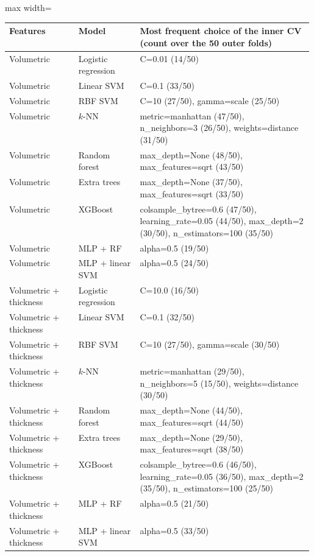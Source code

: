 \begin{table}[H]
\centering
\scriptsize
\setlength{\tabcolsep}{4pt}
\begin{adjustbox}{max width=\linewidth}
\begin{tabular}{llp{0.58\linewidth}}
\toprule
Features & Model & Most frequent choice of the inner CV (count over the 50 outer folds) \\
\midrule
Volumetric & Logistic regression & C=0.01 (14/50) \\
Volumetric & Linear SVM & C=0.1 (33/50) \\
Volumetric & RBF SVM & C=10 (27/50), gamma=scale (25/50) \\
Volumetric & $k$-NN & metric=manhattan (47/50), n\_neighbors=3 (26/50), weights=distance (31/50) \\
Volumetric & Random forest & max\_depth=None (48/50), max\_features=sqrt (43/50) \\
Volumetric & Extra trees & max\_depth=None (37/50), max\_features=sqrt (33/50) \\
Volumetric & XGBoost & colsample\_bytree=0.6 (47/50), learning\_rate=0.05 (44/50), max\_depth=2 (30/50), n\_estimators=100 (35/50) \\
Volumetric & MLP + RF & alpha=0.5 (19/50) \\
Volumetric & MLP + linear SVM & alpha=0.5 (24/50) \\
Volumetric + thickness & Logistic regression & C=10.0 (16/50) \\
Volumetric + thickness & Linear SVM & C=0.1 (32/50) \\
Volumetric + thickness & RBF SVM & C=10 (27/50), gamma=scale (30/50) \\
Volumetric + thickness & $k$-NN & metric=manhattan (29/50), n\_neighbors=5 (15/50), weights=distance (30/50) \\
Volumetric + thickness & Random forest & max\_depth=None (44/50), max\_features=sqrt (44/50) \\
Volumetric + thickness & Extra trees & max\_depth=None (29/50), max\_features=sqrt (38/50) \\
Volumetric + thickness & XGBoost & colsample\_bytree=0.6 (46/50), learning\_rate=0.05 (36/50), max\_depth=2 (35/50), n\_estimators=100 (25/50) \\
Volumetric + thickness & MLP + RF & alpha=0.5 (21/50) \\
Volumetric + thickness & MLP + linear SVM & alpha=0.5 (33/50) \\

\end{tabular}
\end{adjustbox}
\end{table}
